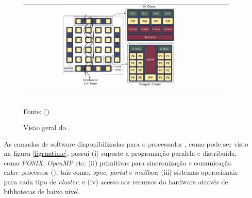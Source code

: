 \documentclass[
	12pt,				%
	openright,			%
	twoside,			%
	a4paper,			%
	english,			%
	brazil,				%
	]{abntex2}
\begin{document}
        \begin{figure}[t]
            \begin{center}
                \caption{Visão geral do \mppa.}
                    \label{figmppa}
                \begin{tabular}{ccc}
                    \includegraphics[width=0.6\textwidth]{figs/mppa-overview.pdf}\\
                \end{tabular}
                \vspace{1ex} \\
                Fonte: ()
            \end{center}
            \vspace{-2ex}
        \end{figure}
            
        As camadas de software disponibilizadas para o processador \mppa, como pode ser visto na figura \ref{figruntime}, possui
        (i) suporte a programação paralela e distribuída, como \textit{POSIX}, \textit{OpenMP} etc;
        (ii) primitivas para sincronização e comunicação entre processos (\ipc), tais como, \textit{sync}, \textit{portal} e \textit{mailbox};
        (iii) sistemas operacionais para cada tipo de \textit{cluster}; e
        (iv) acesso aos recursos do hardware através de bibliotecas de baixo nível.
    
\end{document}
